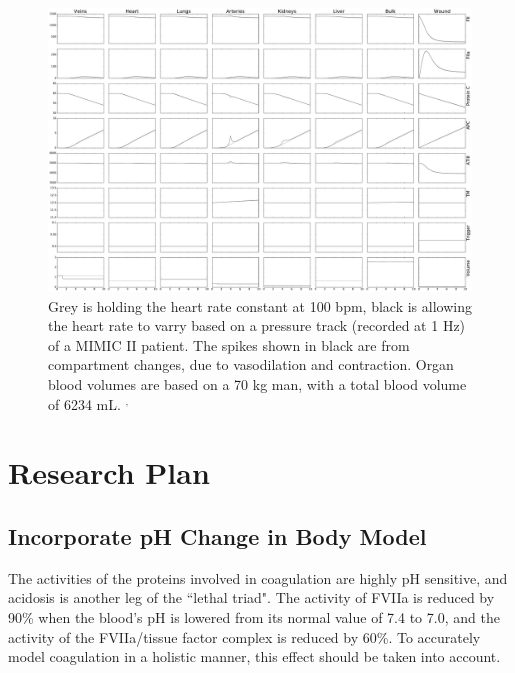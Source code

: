 \documentclass[12pt]{article}
\begin{document}
 \begin{figure}[!htb]
        \centering
        \includegraphics[width=\textwidth]{figures/s31060-2832-03-02-17-54nComparisonGreyConstHRBlackVarryingPPatient}
        \caption{\scriptsize Grey is holding the heart rate constant at 100 bpm, black is allowing the heart rate to varry based on a pressure track (recorded at 1 Hz) of a MIMIC II patient. The spikes shown in black are from compartment changes, due to vasodilation and contraction. Organ blood volumes are based on a 70 kg man, with a total blood volume of 6234 mL.\cite{davy1994total} $^,$ \cite{leggett1991suggested}}
        \label{fig:comparsionPBPK}
\end{figure}


 
\newpage
\section*{Research Plan}
\subsection*{Incorporate pH Change in Body Model}
The activities of the proteins involved in coagulation are highly pH sensitive, and acidosis is another leg of the ``lethal triad". The activity of FVIIa is reduced by 90\% when the blood's pH is lowered from its normal value of 7.4 to 7.0, and the activity of the FVIIa/tissue factor complex is reduced by 60\%. \cite{meng2003effect} To accurately model coagulation in a holistic manner, this effect should be taken into account.
\end{document}
